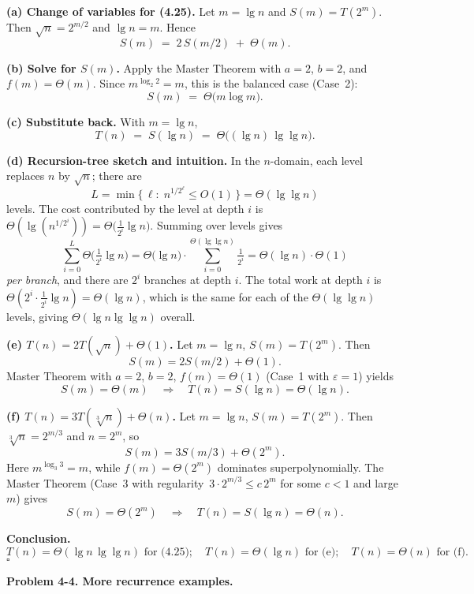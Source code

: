 \documentclass[12pt]{article}
\theoremstyle{definition}
\begin{document}
\medskip
\noindent\textbf{(a) Change of variables for (4.25).}
Let $m=\lg n$ and $S(m)=T(2^m)$. Then $\sqrt{n}=2^{m/2}$ and $\lg n = m$. Hence
\[
S(m)\;=\;2\,S(m/2)\;+\;\Theta(m).
\]

\medskip
\noindent\textbf{(b) Solve for $S(m)$.}
Apply the Master Theorem with $a=2$, $b=2$, and $f(m)=\Theta(m)$.
Since $m^{\log_2 2}=m$, this is the balanced case (Case~2):
\[
S(m)\;=\;\Theta\big(m\log m\big).
\]

\medskip
\noindent\textbf{(c) Substitute back.}
With $m=\lg n$,
\[
T(n)\;=\;S(\lg n)\;=\;\Theta\!\big((\lg n)\,\lg\lg n\big).
\]

\medskip
\noindent\textbf{(d) Recursion-tree sketch and intuition.}
In the $n$-domain, each level replaces $n$ by $\sqrt{n}$; there are
\[
L=\min\{\,\ell:\;n^{1/2^\ell}\le O(1)\,\}=\Theta(\lg\lg n)
\]
levels. The cost contributed by the level at depth $i$ is $\Theta(\lg(n^{1/2^i}))=\Theta\!\big(\tfrac{1}{2^i}\lg n\big)$. Summing over levels gives
\[
\sum_{i=0}^{L}\Theta\!\Big(\tfrac{1}{2^i}\lg n\Big)
=\Theta\!\big(\lg n\big)\cdot \sum_{i=0}^{\Theta(\lg\lg n)}\tfrac{1}{2^i}
=\Theta(\lg n)\cdot\Theta(1)
\]
\emph{per branch}, and there are $2^i$ branches at depth $i$. The total work at depth $i$ is
$\Theta(2^i\cdot \tfrac{1}{2^i}\lg n)=\Theta(\lg n)$, which is the same for each of the
$\Theta(\lg\lg n)$ levels, giving $\Theta(\lg n\lg\lg n)$ overall.

\medskip
\noindent\textbf{(e) $T(n)=2T(\sqrt{n})+\Theta(1)$.}
Let $m=\lg n$, $S(m)=T(2^m)$. Then
\[
S(m)=2S(m/2)+\Theta(1).
\]
Master Theorem with $a=2$, $b=2$, $f(m)=\Theta(1)$ (Case~1 with $\varepsilon=1$) yields
\[
S(m)=\Theta(m)\quad\Rightarrow\quad T(n)=S(\lg n)=\Theta(\lg n).
\]

\medskip
\noindent\textbf{(f) $T(n)=3T(\sqrt[3]{n})+\Theta(n)$.}
Let $m=\lg n$, $S(m)=T(2^m)$. Then $\sqrt[3]{n}=2^{m/3}$ and $n=2^m$, so
\[
S(m)=3S(m/3)+\Theta(2^m).
\]
Here $m^{\log_3 3}=m$, while $f(m)=\Theta(2^m)$ dominates superpolynomially. The Master Theorem
(Case~3 with regularity $\,3\cdot 2^{m/3}\le c\,2^m$ for some $c<1$ and large $m$) gives
\[
S(m)=\Theta(2^m)\quad\Rightarrow\quad T(n)=S(\lg n)=\Theta(n).
\]

\medskip
\noindent\textbf{Conclusion.}
\[
\boxed{T(n)=\Theta(\lg n\,\lg\lg n)\text{ for (4.25)};\quad
T(n)=\Theta(\lg n)\text{ for (e)};\quad
T(n)=\Theta(n)\text{ for (f)}.}
\]
\hfill$\square$

\newpage

\noindent\textbf{Problem 4-4. More recurrence examples.}
\end{document}
